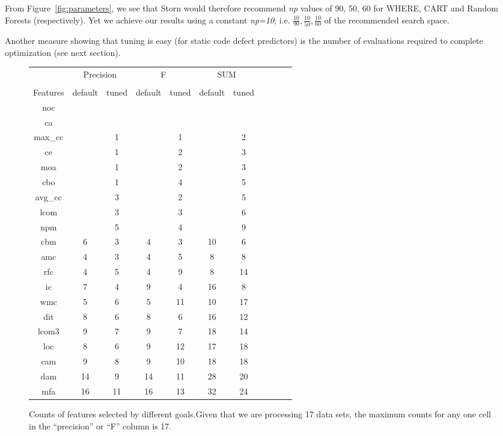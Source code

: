 \documentclass{sig-alternative}
\newcommand{\fig}[1]{Figure~\ref{fig:#1}}
\def\baselinestretch{1}
\begin{document}
From \fig{parameters},
we see that Storn would therefore recommend {\em np} values of
90, 50, 60 for WHERE, CART and Random Forests (respectively). Yet we achieve our results
using a constant {\em np=10}; i.e. $\frac{10}{90}, \frac{10}{50}, \frac{10}{60}$ of the
recommended search space.

Another measure showing that tuning is easy 
(for static code defect predictors)
is the number of evaluations required to complete optimization
(see next section).



\begin{figure}[!t]

\renewcommand{\baselinestretch}{0.8}
\scriptsize
\centering
  \begin{tabular}{c|c c|c c|c c|c c| c c }
  
    &   \multicolumn{2}{c|}{Precision} & \multicolumn{2}{c|}{F} &  \multicolumn{2}{c|}{SUM}\\
 &&&&&&&\\
Features&   
  default
& tuned
& default
& tuned
& default
& tuned
\\\hline

noc &		  &    &    &   \\
ca  &    &    &    &    &    &\\   
max\_cc  &    &  1  &    &  1  &    &  2\\
ce  &    &  1  &    &  2  &    &  3\\
moa  &    &  1  &    &  2  &    &  3\\
cbo  &    &  1  &    &  4  &    &  5\\
avg\_cc  &    &  3  &    &  2  &    &  5\\
lcom  &    &  3  &    &  3  &    &  6\\
npm  &    &  5  &    &  4  &    &  9\\
cbm  &  6  &  3  &  4  &  3  &  10  &  6\\
amc  &  4  &  3  &  4  &  5  &  8  &  8\\
rfc  &  4  &  5  &  4  &  9  &  8  &  14\\
ic  &  7  &  4  &  9  &  4  &  16  &  8\\
wmc  &  5  &  6  &  5  &  11  &  10  &  17\\
dit  &  8  &  6  &  8  &  6  &  16  &  12\\
lcom3  &  9  &  7  &  9  &  7  &  18  &  14\\
loc  &  8  &  6  &  9  &  12  &  17  &  18\\
cam  &  9  &  8  &  9  &  10  &  18  &  18\\
dam  &  14  &  9  &  14  &  11  &  28  &  20\\
mfa  &  16  &  11  &  16  &  13  &  32  &  24
 
  \end{tabular}
    \caption{Counts of features selected by different goals.Given that we are processing 17 data sets, the maximum counts for any 
one cell in the ``precision'' or ``F'' column is 17.  
    }\label{fig:counts}
\end{figure}
 
\end{document}
